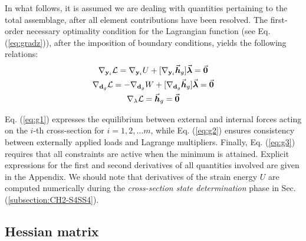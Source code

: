 In what follows, it is assumed we are dealing with quantities pertaining to
the total assemblage, after all element contributions have been resolved.
The first-order necessary optimality condition for the Lagrangian function (see 
Eq.
(\ref{eq:gradz})), after the imposition of boundary conditions, yields the
following relations:
\begin{subequations}
	\begin{gather}
		\nabla_{\mathbf{y}_i}\mathcal{L} = \nabla_{\mathbf{y}_i}U +
		[\nabla_{\mathbf{y}_i}\vec{\boldsymbol{h}}_g]\vec{\boldsymbol{\lambda}} = 
		\vec{\boldsymbol{0}}\label{eq:g1}\\
		\nabla_{\mathbf{d}_g}\mathcal{L} = -\nabla_{\mathbf{d}_g}W +
		[\nabla_{\mathbf{d}_g}\vec{\boldsymbol{h}}_g]\vec{\boldsymbol{\lambda}} = 
		\vec{\boldsymbol{0}}\label{eq:g2}\\
		\nabla_{\mathbf{\lambda}}\mathcal{L} = \vec{\boldsymbol{h}}_g = 
		\vec{\boldsymbol{0}}\label{eq:g3}
	\end{gather}\label{eq:eqtot}
\end{subequations}

\noindent Eq. (\ref{eq:g1}) expresses the equilibrium between external and
internal forces acting on the $i$-th cross-section for $i=1,2,\dots m$,
while Eq.
(\ref{eq:g2}) ensures consistency between externally applied loads and Lagrange
multipliers. Finally, Eq. (\ref{eq:g3}) requires that all constraints are
active when the minimum is attained. Explicit expressions for the first and
second derivatives of all quantities involved are given in the Appendix. We
should note that derivatives of the strain energy $U$ are computed
numerically during the \emph{cross-section state determination} phase in Sec.
(\ref{subsection:CH2-S4SS4}).

\subsection{Hessian matrix}\label{subsection:CH2-S4SS2}

